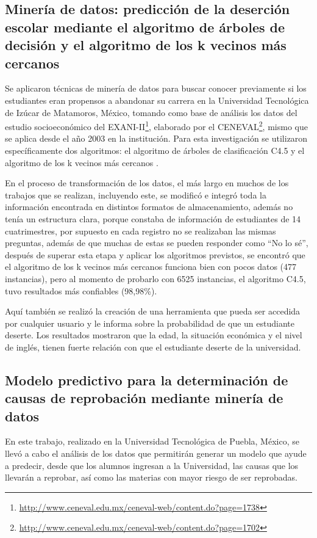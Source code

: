 \subsection{Minería de datos: predicción de la deserción escolar mediante el algoritmo de árboles de decisión y el algoritmo de los k vecinos más cercanos \cite{key-130}}
Se aplicaron técnicas de minería de datos para buscar conocer previamente si los estudiantes eran propensos a abandonar su carrera en la Universidad Tecnológica de Izúcar de Matamoros, México, tomando como base de análisis los datos del estudio socioeconómico del EXANI-II\footnote{\url{http://www.ceneval.edu.mx/ceneval-web/content.do?page=1738}}, elaborado por el CENEVAL\footnote{\url{http://www.ceneval.edu.mx/ceneval-web/content.do?page=1702}}, mismo que se aplica desde el año 2003 en la institución. Para esta investigación se utilizaron específicamente dos algoritmos: el algoritmo de árboles de clasificación C4.5 y el algoritmo de los k vecinos más cercanos \cite{key-70}.

En el proceso de transformación de los datos, el más largo en muchos de los trabajos que se realizan, incluyendo este, se modificó e integró toda la información encontrada en distintos formatos de almacenamiento, además no tenía un estructura clara, porque constaba de información de estudiantes de 14 cuatrimestres, por supuesto en cada registro no se realizaban las mismas preguntas, además de que muchas de estas se pueden responder como ``No lo sé'', después de superar esta etapa y aplicar los algoritmos previstos, se encontró que el algoritmo de los k vecinos más cercanos funciona bien con pocos datos (477 instancias), pero al momento de probarlo con 6525 instancias, el algoritmo C4.5, tuvo resultados más confiables (98,98\%).

Aquí también se realizó la creación de una herramienta que pueda ser accedida por cualquier usuario y le informa sobre la probabilidad de que un estudiante deserte. Los resultados mostraron que la edad, la situación económica y el nivel de inglés, tienen fuerte relación con que el estudiante deserte de la universidad.
\subsection{Modelo predictivo para la determinación de causas de reprobación mediante minería de datos \cite{key-140}}
En este trabajo, realizado en la Universidad Tecnológica de Puebla, México, se llevó a cabo el análisis de los datos que permitirán generar un modelo que ayude a predecir, desde que los alumnos ingresan a la Universidad, las causas que los llevarán a reprobar, así como las materias con mayor riesgo de ser reprobadas.

